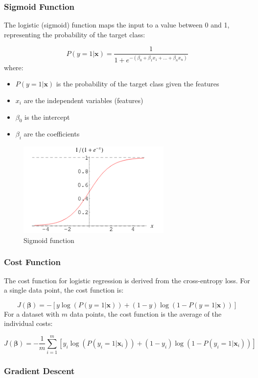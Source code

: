 \documentclass[12pt]{article}
\begin{document}
\subsubsection{Sigmoid Function}

The logistic (sigmoid) function maps the input to a value between 0 and 1, representing the probability of the target class:

$$P(y=1 | \mathbf{x}) = \frac{1}{1 + e^{-(\beta_0 + \beta_1 x_1 + \dots + \beta_n x_n)}}$$
where:
\begin{itemize}
\item $P(y=1 | \mathbf{x})$ is the probability of the target class given the features
\item $x_i$ are the independent variables (features)
\item $\beta_0$ is the intercept
\item $\beta_i$ are the coefficients
\end{itemize}

\begin{figure}[h]
    \centering
    \includegraphics[scale=0.7]{./media/sigmoid.png}
    \caption{Sigmoid function}
    \label{fig:f_sigmoid}
\end{figure}

\subsubsection{Cost Function}

The cost function for logistic regression is derived from the cross-entropy loss. For a single data point, the cost function is:

$$ J(\boldsymbol{\beta}) = -[y \log(P(y=1 | \mathbf{x})) + (1 - y) \log(1 - P(y=1 | \mathbf{x}))] $$
For a dataset with $m$ data points, the cost function is the average of the individual costs:

$$J(\boldsymbol{\beta}) = -\frac{1}{m}\sum_{i=1}^m [y_i \log(P(y_i=1 | \mathbf{x}_i)) + (1 - y_i) \log(1 - P(y_i=1 | \mathbf{x}_i))]$$

\subsubsection{Gradient Descent}
\end{document}
